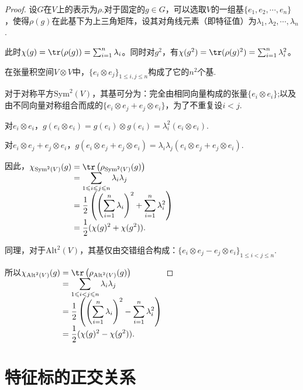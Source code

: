 \begin{proof}
    设$G$在$V$上的表示为$\rho$.对于固定的$g\in G$，可以选取$V$的一组基$\{e_1, e_2, \cdots, e_n\}$，使得$\rho(g)$在此基下为上三角矩阵，设其对角线元素（即特征值）为$\lambda_1, \lambda_2, \cdots, \lambda_n$.\par
    此时$\chi(g) = \tr(\rho(g)) = \sum_{i=1}^n \lambda_i$。同时对$g^2$，有$\chi(g^2) = \tr(\rho(g)^2) = \sum_{i=1}^n \lambda_i^2$。\par
    在张量积空间$V\otimes V$中，$\{e_i \otimes e_j\}_{1\leq i,j \leq n}$构成了它的$n^2$个基.\par
    对于对称平方$\mathrm{Sym}^2(V)$，其基可分为：完全由相同向量构成的张量$\{e_i\otimes e_i\}$;以及由不同向量对称组合而成的$\{e_i\otimes e_j + e_j\otimes e_i\}$，为了不重复设$i<j$.\par
    对$e_i\otimes e_i$，$g(e_i\otimes e_i)=g(e_i)\otimes g(e_i)=\lambda_i^2(e_i\otimes e_i)$.\par
    对$e_i\otimes e_j + e_j\otimes e_i$，$g(e_i\otimes e_j+e_j\otimes e_i) = \lambda_i\lambda_j(e_i\otimes e_j+e_j\otimes e_i)$.\par
    因此，$\setjot[-2]\begin{aligned}[t]
        \chi_{\mathrm{Sym}^2(V)}(g) &= \tr\left(\rho_{\mathrm{Sym}^2(V)}(g)\right) \\
        &= \sum_{1\leq i \leq j \leq n} \lambda_i\lambda_j \\
        &= \frac{1}{2}\left( \left(\sum_{i=1}^n \lambda_i\right)^2 + \sum_{i=1}^n \lambda_i^2 \right) \\
        &= \frac{1}{2}(\chi(g)^2 + \chi(g^2)).
    \end{aligned}$\par
    同理，对于$\mathrm{Alt}^2(V)$，其基仅由交错组合构成：$\{e_i \otimes e_j - e_j \otimes e_i\}_{1\leq i < j \leq n}$.\par
    所以$\setjot[-2]\begin{aligned}[t]
        \chi_{\mathrm{Alt}^2(V)}(g) &= \tr\left(\rho_{\mathrm{Alt}^2(V)}(g)\right) \\
        &= \sum_{1\leq i < j \leq n} \lambda_i\lambda_j \\
        &= \frac{1}{2}\left( \left(\sum_{i=1}^n \lambda_i\right)^2 - \sum_{i=1}^n \lambda_i^2 \right) \\
        &= \frac{1}{2}(\chi(g)^2 - \chi(g^2)). \qedhere
    \end{aligned}$
\end{proof}

\section{特征标的正交关系}

